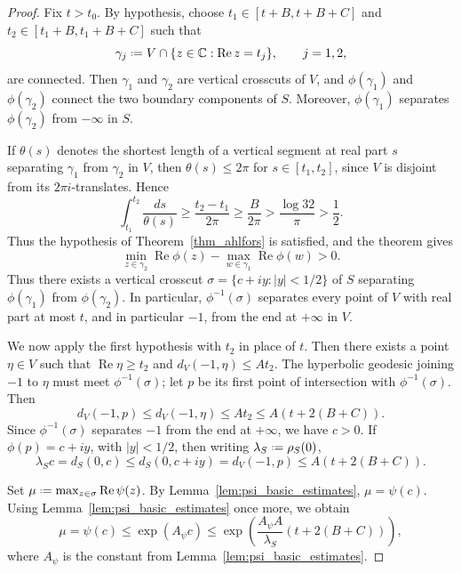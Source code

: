 \documentclass[a4paper, 11pt, reqno]{amsart}
\numberwithin{equation}{section}
\theoremstyle{plain}
\newcommand*{\defeq}{\mathrel{\vcenter{\baselineskip0.5ex \lineskiplimit0pt
 \hbox{\scriptsize.}\hbox{\scriptsize.}}}=}
\theoremstyle{remark}
\newcommand{\C}{{\mathbb{C}}}
\newcommand{\Rea}{\operatorname{Re }}
\begin{document}
\begin{proof}
Fix \(t>t_0\). By hypothesis, choose
\(t_1\in[t+B,t+B+C]\) and \(t_2\in[t_1+B,t_1+B+C]\) such that
\[
\gamma_j\defeq V\cap\{z\in\C:\Rea z=t_j\},\qquad j=1,2,
\]
are connected. Then \(\gamma_1\) and \(\gamma_2\) are vertical crosscuts
of \(V\), and \(\phi(\gamma_1)\) and \(\phi(\gamma_2)\) connect the two
boundary components of \(S\). Moreover, \(\phi(\gamma_1)\) separates
\(\phi(\gamma_2)\) from \(-\infty\) in \(S\).

If \(\theta(s)\) denotes the shortest length of a vertical segment at real
part \(s\) separating \(\gamma_1\) from \(\gamma_2\) in \(V\), then
\(\theta(s)\le 2\pi\) for \(s\in[t_1,t_2]\), since \(V\) is disjoint from
its \(2\pi i\)-translates. Hence
\[
\int_{t_1}^{t_2}\frac{ds}{\theta(s)}
\ge \frac{t_2-t_1}{2\pi}
\ge \frac{B}{2\pi}
> \frac{\log 32}{\pi}> \frac12.
\]
Thus the hypothesis of Theorem~\ref{thm_ahlfors} is satisfied, and the theorem gives
\[
\min_{z\in\gamma_2}\Rea\phi(z)
-
\max_{w\in\gamma_1}\Rea\phi(w)>0.
\]
Thus there exists a vertical crosscut \(\sigma=\{c+iy:|y|<1/2\}\) of \(S\) separating \(\phi(\gamma_1)\) from \(\phi(\gamma_2)\). In particular, \(\phi^{-1}(\sigma)\) separates every point of \(V\) with real part at most \(t\), and in particular \(-1\), from the end at \(+\infty\) in \(V\). 

We now apply the first hypothesis with \(t_2\) in place of \(t\). Then there exists a point \(\eta\in V\) such that \(\Rea\eta\ge t_2\) and \(d_V(-1,\eta)\le At_2\). The hyperbolic geodesic joining \(-1\) to \(\eta\) must meet \(\phi^{-1}(\sigma)\); let \(p\) be its first point of intersection with \(\phi^{-1}(\sigma)\). Then
\[
d_V(-1,p)\le d_V(-1,\eta)\le At_2\le A(t+2(B+C)).
\]
Since \(\phi^{-1}(\sigma)\) separates \(-1\) from the end at \(+\infty\), we have \(c>0\). If \(\phi(p)=c+iy\), with \(|y|<1/2\), then writing \(\lambda_S\defeq\rho_S(0)\),
\[
\lambda_S c
= d_S(0,c)
\le d_S(0,c+iy)
= d_V(-1,p)
\le A(t+2(B+C)).
\]

Set \(\mu\defeq\max_{z\in\sigma}\Rea\psi(z)\). By Lemma~\ref{lem:psi_basic_estimates}, \(\mu=\psi(c)\). 
Using Lemma~\ref{lem:psi_basic_estimates} once more, we obtain
\[
\mu=\psi(c)\le \exp(A_\psi c)
\le \exp\left(\frac{A_\psi A}{\lambda_S}(t+2(B+C))\right),
\]
where \(A_\psi\) is the constant from Lemma~\ref{lem:psi_basic_estimates}.


\end{proof}
\end{document}
